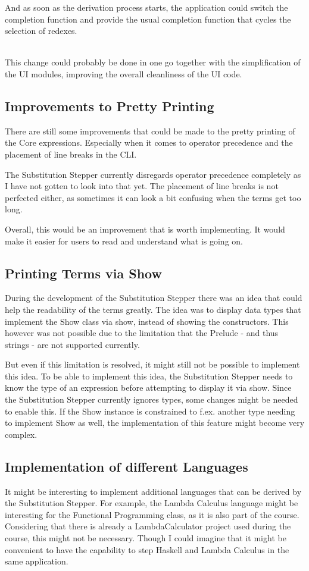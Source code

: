 And as soon as the derivation process starts,
the application could switch the completion function and provide the usual completion function that cycles the selection of redexes.

\ \\
This change could probably be done in one go together with the simplification of the UI modules,
improving the overall cleanliness of the UI code.

\subsection{Improvements to Pretty Printing}
There are still some improvements that could be made to the pretty printing of the Core expressions.
Especially when it comes to operator precedence and the placement of line breaks in the CLI.

The Substitution Stepper currently disregards operator precedence completely as I have not gotten to look into that yet.
The placement of line breaks is not perfected either,
as sometimes it can look a bit confusing when the terms get too long.

Overall, this would be an improvement that is worth implementing.
It would make it easier for users to read and understand what is going on.

\subsection{Printing Terms via Show}
During the development of the Substitution Stepper there was an idea that could help the readability of the terms greatly.
The idea was to display data types that implement the Show class via show, instead of showing the constructors.
This however was not possible due to the limitation that the Prelude - and thus strings - are not supported currently.

But even if this limitation is resolved,
it might still not be possible to implement this idea.
To be able to implement this idea,
the Substitution Stepper needs to know the type of an expression before attempting to display it via show.
Since the Substitution Stepper currently ignores types,
some changes might be needed to enable this.
If the Show instance is constrained to f.ex. another type needing to implement Show as well,
the implementation of this feature might become very complex.

\subsection{Implementation of different Languages}
It might be interesting to implement additional languages that can be derived by the Substitution Stepper.
For example,
the Lambda Calculus language might be interesting for the Functional Programming class,
as it is also part of the course.
Considering that there is already a LambdaCalculator project used during the course,
this might not be necessary.
Though I could imagine that it might be convenient to have the capability to step Haskell and Lambda Calculus in the same application.
